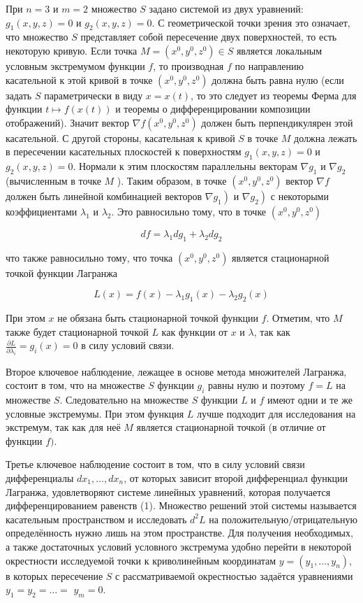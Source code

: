 \documentclass[a4paper,12pt]{article} %
\begin{document}
При $n=3$ и $m=2$ множество $S$ задано системой из двух уравнений: $g_{1}(x, y, z)=0$ и $g_{2}(x, y, z)=0$. С геометрической точки зрения это означает, что множество $S$ представляет собой пересечение двух поверхностей, то есть некоторую кривую. Если точка $M=\left(x^{0}, y^{0}, z^{0}\right) \in S$ является локальным условным экстремумом функции $f$, то производная $f$ по направлению касательной к этой кривой в точке $\left(x^{0}, y^{0}, z^{0}\right)$ должна быть равна нулю (если задать $S$ параметрически в виду $x=x(t)$, то это следует из теоремы Ферма для функции $t \mapsto f(x(t))$ и теоремы о дифференцировании композиции отображений). Значит вектор $\nabla f\left(x^{0}, y^{0}, z^{0}\right)$ должен быть перпендикулярен этой касательной. С другой стороны, касательная к кривой $S$ в точке $M$ должна лежать в пересечении касательных плоскостей к поверхностям $g_{1}(x, y, z)=0$ и $g_{2}(x, y, z)=0$. Нормали к этим плоскостям параллельны векторам $\nabla g_{1}$ и $\nabla g_{2}$ (вычисленным в точке $M$ ). Таким образом, в точке $\left(x^{0}, y^{0}, z^{0}\right)$ вектор $\nabla f$ должен быть линейной комбинацией векторов $\left.\nabla g_{1}\right)$ и $\left.\nabla g_{2}\right)$ с некоторыми коэффициентами $\lambda_{1}$ и $\lambda_{2}$. Это равносильно тому, что в точке $\left(x^{0}, y^{0}, z^{0}\right)$

$$
d f=\lambda_{1} d g_{1}+\lambda_{2} d g_{2}
$$

что также равносильно тому, что точка $\left(x^{0}, y^{0}, z^{0}\right)$ является стационарной точкой функции Лагранжа

$$
L(x)=f(x)-\lambda_{1} g_{1}(x)-\lambda_{2} g_{2}(x)
$$

При этом $x$ не обязана быть стационарной точкой функции $f$. Отметим, что $M$ также будет стационарной точкой $L$ как функции от $x$ и $\lambda$, так как $\frac{\partial L}{\partial \lambda_{i}}=g_{i}(x)=0$ в силу условий связи.

Второе ключевое наблюдение, лежащее в основе метода множителей Лагранжа, состоит в том, что на множестве $S$ функции $g_{i}$ равны нулю и поэтому $f=L$ на множестве $S$. Следовательно на множестве $S$ функции $L$ и $f$ имеют одни и те же условные экстремумы. При этом функция $L$ лучше подходит для исследования на экстремум, так как для неё $M$ является стационарной точкой (в отличие от функции $f)$.

Третье ключевое наблюдение состоит в том, что в силу условий связи дифференциалы $d x_{1}, \ldots, d x_{n}$, от которых зависит второй дифференциал функции Лагранжа, удовлетворяют системе линейных уравнений, которая получается дифференцированием равенств (1). Множество решений этой системы называется касательным пространством и исследовать $d^{2} L$ на положительную/отрицательную определённость нужно лишь на этом пространстве. Для получения необходимых, а также достаточных условий условного экстремума удобно перейти в некоторой окрестности исследуемой точки к криволинейным координатам $y=\left(y_{1}, \ldots, y_{n}\right)$, в которых пересечение $S$ с рассматриваемой окрестностью задаётся уравнениями $y_{1}=y_{2}=\ldots=$ $y_{m}=0$.
\end{document}
